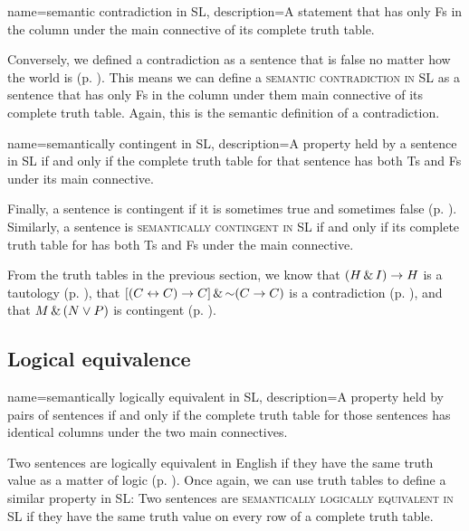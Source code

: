 {
name=semantic contradiction in SL,
description={A statement that has only Fs in the column under the main connective of its complete truth table.}
}


Conversely, we defined a contradiction as a sentence that is false no matter how the world is (p. \pageref{def:contradiction}). 
This means we can define a \textsc{\gls{semantic contradiction in SL}} \label{def:semantic_contradiction_in_sl} as a sentence that has only Fs in the column under them main connective of its complete truth table. Again, this is the semantic definition of a contradiction. 

{
name=semantically contingent in SL,
description={A property held by a sentence in SL if and only if the complete truth table for that sentence has both Ts and Fs under its main connective.}
}

Finally, a sentence is contingent if it is sometimes true and sometimes false (p. \pageref{def:contingent_statement}). Similarly, a sentence is \textsc{\gls{semantically contingent in SL}} \label{def:semantically_contingent_in_sl} if and only if its complete truth table for has both Ts and Fs under the main connective. 

From the truth tables in the previous section, we know that $(H\,\&\, I)\rightarrow H$ is a tautology (p. \pageref{tautology3.1}), that $[(C\leftrightarrow C) \rightarrow C] \,\&\, \mathord{\sim}(C \rightarrow C)$ is a contradiction (p. \pageref{contradiction3.1}), and that $M \,\&\, (N \vee P)$ is contingent (p. \pageref{contingentsentence3.1}).

\vfill

\subsection{Logical equivalence}

{
name=semantically logically equivalent in SL,
description={A property held by pairs of sentences if and only if the complete truth table for those sentences has identical columns under the two main connectives.}
}



Two sentences are logically equivalent in English if they have the same truth value as a matter of logic (p. \pageref{def:logical_equivalence}). Once again, we can use truth tables to define a similar property in SL: Two sentences are \textsc{\gls{semantically logically equivalent in SL}} \label{def:semantically_logically_equivalent_in_sl} if they have the same truth value on every row of a complete truth table.

